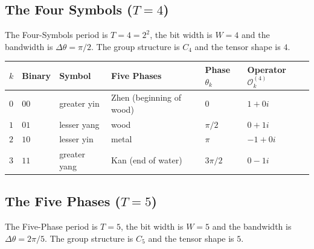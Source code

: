 \subsection{\texorpdfstring{The Four Symbols ($T=4$)}{The Four Symbols (T=4)}}

\begin{definition}\label{def:sixiang_operators}
The Four-Symbols period is $T=4=2^2$, the bit width is $W=4$ and the bandwidth is $\Delta\theta=\pi/2$. The group structure is $C_4$ and the tensor shape is $4$.
\end{definition}

\begin{center}
\begin{tabular}{>{\centering\arraybackslash}p{0.7cm}>{\centering\arraybackslash}p{1.5cm}>{\centering\arraybackslash}p{1.8cm}>{\centering\arraybackslash}p{2.2cm}>{\centering\arraybackslash}p{2.5cm}>{\centering\arraybackslash}p{2.8cm}}
\toprule
$k$ & Binary & Symbol & Five Phases & Phase $\theta_k$ & Operator $\mathcal{O}_k^{(4)}$ \\
\midrule
$0$ & $00$ & greater yin & Zhen (beginning of wood) & $0$ & $1+0i$ \\
$1$ & $01$ & lesser yang & wood & $\pi/2$ & $0+1i$ \\
$2$ & $10$ & lesser yin & metal & $\pi$ & $-1+0i$ \\
$3$ & $11$ & greater yang & Kan (end of water) & $3\pi/2$ & $0-1i$ \\
\bottomrule
\end{tabular}
\end{center}

\subsection{\texorpdfstring{The Five Phases ($T=5$)}{The Five Phases (T=5)}}

\begin{definition}\label{def:wuxing_operators}
The Five-Phase period is $T=5$, the bit width is $W=5$ and the bandwidth is $\Delta\theta=2\pi/5$. The group structure is $C_5$ and the tensor shape is $5$.
\end{definition}

